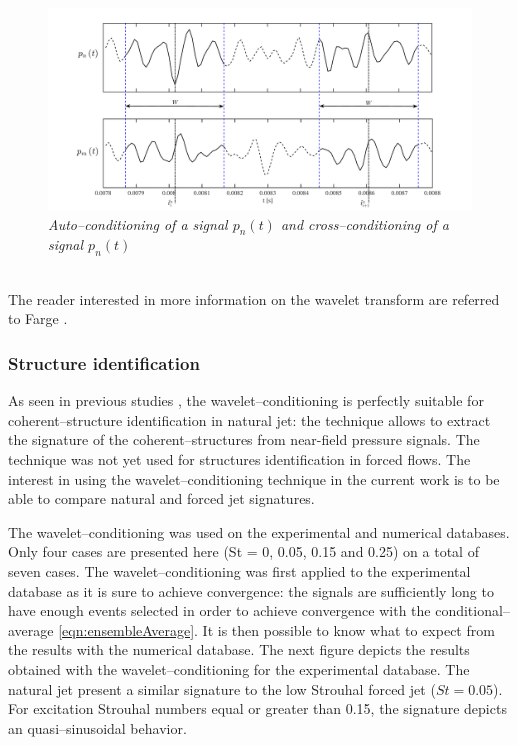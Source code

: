 \documentclass[english]{aiaa-tc}
\begin{document}
 \begin{figure}[!ht]
\centering
    \includegraphics[width=1\textwidth]{figures/pdf/condNcond}
\caption{\textit{Auto--conditioning of a signal $p_n(t)$ and cross--conditioning of a signal $p_n(t)$}}
\label{fig:condNcond}
\end{figure} \\
 The reader interested in more information on the wavelet transform are referred to Farge \cite{Farge1992}.

\subsubsection{Structure identification}
As seen in previous studies \cite{Camussi1997,Camussi1997b,Camussi2002}, the wavelet--conditioning is perfectly suitable
for coherent--structure identification in natural jet: the technique allows to extract the signature of the coherent--structures from near-field pressure signals.
The technique was not yet used for structures identification in forced flows.
The interest in using the wavelet--conditioning technique in the current work is to be able to compare natural and forced jet signatures.

The wavelet--conditioning was used on the experimental and numerical databases.
Only four cases are presented here (St = 0, 0.05, 0.15 and 0.25) on a total of seven cases.
The wavelet--conditioning was first applied to the experimental database as it is sure to achieve convergence: the signals are sufficiently long to have
enough events selected in order to achieve convergence with the conditional--average \ref{eqn:ensembleAverage}. It is then possible to know what to expect from
the results with the numerical database. The next figure depicts the results obtained with the wavelet--conditioning for the experimental database.
The natural jet present a similar signature to the low Strouhal forced jet ($St = 0.05$).
For excitation Strouhal numbers equal or greater than 0.15, the signature depicts an quasi--sinusoidal behavior.
\end{document}
